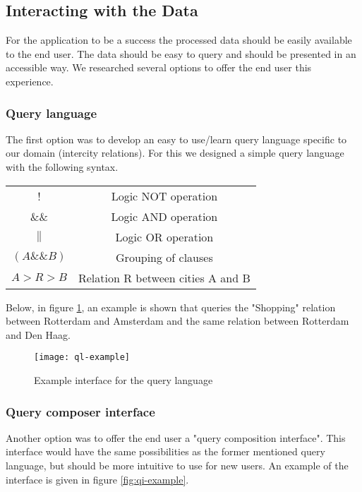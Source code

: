 \subsection{Interacting with the Data}

For the application to be a success the processed data should be easily available to the end user. The data should be easy to query and should be presented in an accessible way.
We researched several options to offer the end user this experience.

\subsubsection{Query language}

The first option was to develop an easy to use/learn query language specific to our domain (intercity relations). For this we designed a simple query language with the following syntax.

\begin{center}
\begin{tabular}{ |c|c| } 
 \hline
 ! & Logic NOT operation \\
 \&\& & Logic AND operation \\ 
 $\|$ & Logic OR operation \\ 
 $( A \&\& B )$ & Grouping of clauses \\
 $A > R > B$ & Relation R between cities A and B \\
 \hline
\end{tabular}
\end{center}

Below, in figure \ref{fig:ql-example}, an example is shown that queries the "Shopping" relation between Rotterdam and Amsterdam and the same relation between Rotterdam and Den Haag.

\begin{figure}[h]
\centering
\texttt{[image: ql-example]}
\caption{Example interface for the query language}
\label{fig:ql-example}
\end{figure}

\subsubsection{Query composer interface}

Another option was to offer the end user a "query composition interface". This interface would have the same possibilities as the former mentioned query language, but should be more intuitive to use for new users. An example of the interface is given in figure \ref{fig:qi-example}.


